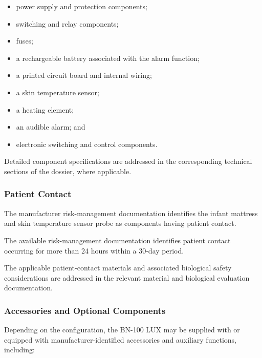 \begin{itemize}
    \item power supply and protection components;
    \item switching and relay components;
    \item fuses;
    \item a rechargeable battery associated with the alarm function;
    \item a printed circuit board and internal wiring;
    \item a skin temperature sensor;
    \item a heating element;
    \item an audible alarm; and
    \item electronic switching and control components.
\end{itemize}

Detailed component specifications are addressed in the corresponding
technical sections of the dossier, where applicable.


\subsubsection{Patient Contact}

The manufacturer risk-management documentation identifies the infant
mattress and skin temperature sensor probe as components having
patient contact.

The available risk-management documentation identifies patient
contact occurring for more than 24 hours within a 30-day period.

The applicable patient-contact materials and associated biological
safety considerations are addressed in the relevant material and
biological evaluation documentation.


\subsubsection{Accessories and Optional Components}

Depending on the configuration, the BN-100 LUX may be supplied with
or equipped with manufacturer-identified accessories and auxiliary
functions, including:

